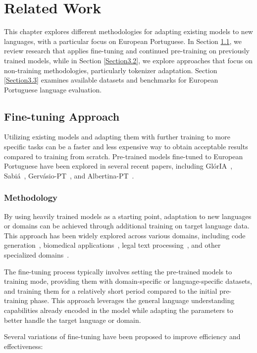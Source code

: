\chapter{Related Work}
\label{Section3}

This chapter explores different methodologies for adapting existing models to new languages, with a particular focus on European Portuguese. In Section \ref{Section3.1}, we review research that applies fine-tuning and continued pre-training on previously trained models, while in Section \ref{Section3.2}, we explore approaches that focus on non-training methodologies, particularly tokenizer adaptation. Section \ref{Section3.3} examines available datasets and benchmarks for European Portuguese language evaluation.

\section{Fine-tuning Approach}\label{Section3.1}
Utilizing existing models and adapting them with further training to more specific tasks can be a faster and less expensive way to obtain acceptable results compared to training from scratch.
Pre-trained models fine-tuned to European Portuguese have been explored in several recent papers, including GlórIA~\cite{Gloria}, Sabiá~\cite{Sabia}, Gervásio-PT~\cite{Gervasio}, and Albertina-PT~\cite{Albertina}.

\subsection{Methodology}
By using heavily trained models as a starting point, adaptation to new languages or domains can be achieved through additional training on target language data. This approach has been widely explored across various domains, including code generation~\cite{chen2021evaluating}, biomedical applications~\cite{lee2020biobert}, legal text processing~\cite{chalkidis2020legal}, and other specialized domains~\cite{gururangan2020don}.

The fine-tuning process typically involves setting the pre-trained models to training mode, providing them with domain-specific or language-specific datasets, and training them for a relatively short period compared to the initial pre-training phase. This approach leverages the general language understanding capabilities already encoded in the model while adapting the parameters to better handle the target language or domain.

Several variations of fine-tuning have been proposed to improve efficiency and effectiveness:

